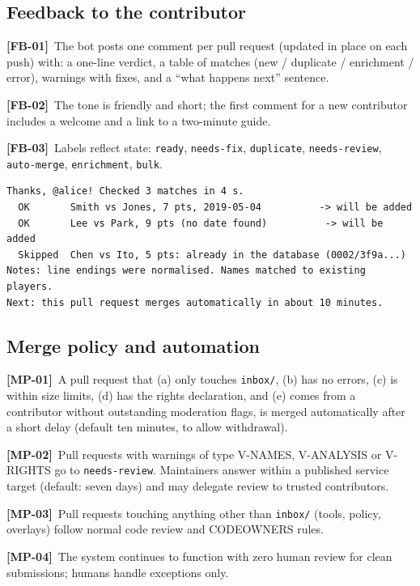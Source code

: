 \documentclass[11pt,a4paper]{article}
\newcommand{\req}[2]{\par\smallskip\noindent\hypertarget{#1}{}\textbf{[#1]}\ #2\par}
\begin{document}
\subsection{Feedback to the contributor}
\req{FB-01}{The bot posts one comment per pull request (updated in place on each push) with: a one-line verdict, a table of matches (new / duplicate / enrichment / error), warnings with fixes, and a ``what happens next'' sentence.}
\req{FB-02}{The tone is friendly and short; the first comment for a new contributor includes a welcome and a link to a two-minute guide.}
\req{FB-03}{Labels reflect state: \texttt{ready}, \texttt{needs-fix}, \texttt{duplicate}, \texttt{needs-review}, \texttt{auto-merge}, \texttt{enrichment}, \texttt{bulk}.}
\begin{lstlisting}
Thanks, @alice! Checked 3 matches in 4 s.
  OK       Smith vs Jones, 7 pts, 2019-05-04          -> will be added
  OK       Lee vs Park, 9 pts (no date found)          -> will be added
  Skipped  Chen vs Ito, 5 pts: already in the database (0002/3f9a...)
Notes: line endings were normalised. Names matched to existing players.
Next: this pull request merges automatically in about 10 minutes.
\end{lstlisting}

\subsection{Merge policy and automation}\label{sec:merge}
\req{MP-01}{A pull request that (a) only touches \texttt{inbox/}, (b) has no errors, (c) is within size limits, (d) has the rights declaration, and (e) comes from a contributor without outstanding moderation flags, is merged automatically after a short delay (default ten minutes, to allow withdrawal).}
\req{MP-02}{Pull requests with warnings of type V-NAMES, V-ANALYSIS or V-RIGHTS go to \texttt{needs-review}. Maintainers answer within a published service target (default: seven days) and may delegate review to trusted contributors.}
\req{MP-03}{Pull requests touching anything other than \texttt{inbox/} (tools, policy, overlays) follow normal code review and CODEOWNERS rules.}
\req{MP-04}{The system continues to function with zero human review for clean submissions; humans handle exceptions only.}
\end{document}

